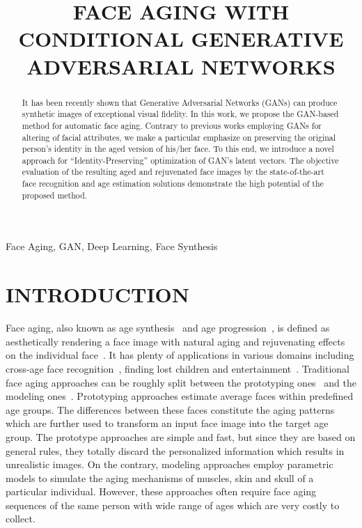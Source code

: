 \documentclass{article}
\title{FACE AGING WITH CONDITIONAL GENERATIVE ADVERSARIAL NETWORKS}
\begin{document}

\maketitle

\begin{abstract}

It has been recently shown that Generative Adversarial Networks (GANs) can produce synthetic images of exceptional visual fidelity.
In this work, we propose the GAN-based method for automatic face aging.
Contrary to previous works employing GANs for altering of facial attributes, we make a particular emphasize on preserving the original person's identity in the aged version of his/her face.
To this end, we introduce a novel approach for ``Identity-Preserving'' optimization of GAN's latent vectors.
The objective evaluation of the resulting aged and rejuvenated face images by the state-of-the-art face recognition and age estimation solutions demonstrate the high potential of the proposed method. 

\end{abstract}

\begin{keywords}

Face Aging, GAN, Deep Learning, Face Synthesis

\end{keywords}

\section{INTRODUCTION}
\label{sec:introduction}

Face aging, also known as age synthesis~\cite{fu2010age} and age progression~\cite{shu2015personalized}, is defined as aesthetically rendering a face image with natural aging and rejuvenating effects on the
individual face~\cite{fu2010age}.
It has plenty of applications in various domains including cross-age face recognition~\cite{park2010age}, finding lost children and entertainment~\cite{wang2016recurrent}.
Traditional face aging approaches can be roughly split between the prototyping ones~\cite{tiddeman2001prototyping,kemelmacher2014illumination} and the modeling ones~\cite{suo2010compositional,tazoe2012facial}.
Prototyping approaches estimate average faces within predefined age groups.
The differences between these faces constitute the aging patterns which are further used to transform an input face image into the target age group.
The prototype approaches are simple and fast, but since they are based on general rules, they totally discard the personalized information which results in unrealistic images.
On the contrary, modeling approaches employ parametric models to simulate the aging mechanisms of muscles, skin and skull of a particular individual.
However, these approaches often require face aging sequences of the same person with wide range of ages which are very costly to collect.
\end{document}
